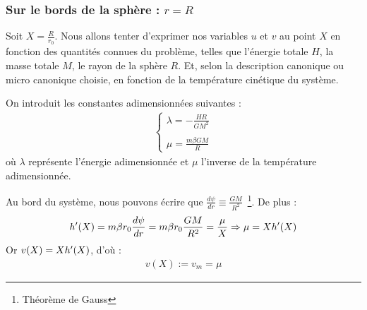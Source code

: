 \subsubsection{Sur le bords de la sphère : $r = R$}
	Soit $X = \frac{R}{r_0}$. Nous allons tenter d'exprimer nos variables $u$ et $v$ au point $X$ en fonction des quantités connues du problème,
	telles que l'énergie totale $H$, la masse totale $M$, le rayon de la sphère $R$.
	Et, selon la description canonique ou micro canonique choisie, en fonction de la température cinétique du système.

	On introduit les constantes adimensionnées suivantes :
	\begin{eqnarray*}
		\left\{\begin{array}{l}
			\lambda = - \frac{H R}{G M^2} \\
			\\
			\mu     = \frac{m\beta GM}{R}
		\end{array}\right.
	\end{eqnarray*}
	où $\lambda$ représente l'énergie adimensionnée et $\mu$ l'inverse de la température adimensionnée.

	Au bord du système, nous pouvons écrire que $\frac{d \psi}{dr} \equiv \frac{GM}{R^2}$~\footnote{Théorème de Gauss}. De plus :
	\begin{eqnarray*}
		h'(X) = m\beta r_0 \frac{d \psi}{dr} = m\beta r_0 \frac{GM}{R^2} = \frac{\mu}{X} \Rightarrow \mu = Xh'(X)
	\end{eqnarray*}
	Or $v(X) = Xh'(X)$, d'où :
	\begin{eqnarray}
		v\left(X\right) := v_m = \mu\label{vmmu}
	\end{eqnarray}

